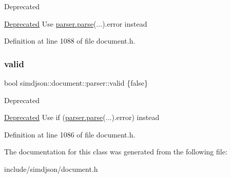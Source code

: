 \begin{DoxyRefDesc}{Deprecated}
\item[\hyperlink{deprecated__deprecated000004}{Deprecated}]Use {\ttfamily \hyperlink{classsimdjson_1_1document_1_1parser_a3eb1fd46ea0dad62eceed4b1c302b7ad}{parser.\+parse}(...).error} instead \end{DoxyRefDesc}


Definition at line 1088 of file document.\+h.

\mbox{\label{classsimdjson_1_1document_1_1parser_a1aaf05806149d370d15140125038d3b2}} 
\subsubsection{\texorpdfstring{valid}{valid}}
{\footnotesize\ttfamily bool simdjson\+::document\+::parser\+::valid \{false\}}

\begin{DoxyRefDesc}{Deprecated}
\item[\hyperlink{deprecated__deprecated000003}{Deprecated}]Use {\ttfamily if (\hyperlink{classsimdjson_1_1document_1_1parser_a3eb1fd46ea0dad62eceed4b1c302b7ad}{parser.\+parse}(...).error)} instead \end{DoxyRefDesc}


Definition at line 1086 of file document.\+h.



The documentation for this class was generated from the following file\+:\begin{DoxyCompactItemize}
\item 
include/simdjson/document.\+h\end{DoxyCompactItemize}
